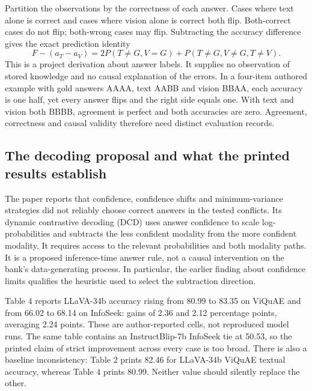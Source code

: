 Partition the observations by the correctness of each answer. Cases where
text alone is correct and cases where vision alone is correct both flip.
Both-correct cases do not flip; both-wrong cases may flip. Subtracting the
accuracy difference gives the exact prediction identity
\begin{equation}
 F-(a_T-a_V)=
 2P(T\ne G,V=G)+P(T\ne G,V\ne G,T\ne V).
 \label{exec23:conflict-identity}
\end{equation}
This is a project derivation about answer labels. It supplies no observation
of stored knowledge and no causal explanation of the errors. In a four-item
authored example with gold answers AAAA, text AABB and vision BBAA, each
accuracy is one half, yet every answer flips and the right side equals one.
With text and vision both BBBB, agreement is perfect and both accuracies are
zero. Agreement, correctness and causal validity therefore need distinct
evaluation records.~\citep{exec23_context_reference}

\subsection{The decoding proposal and what the printed results establish}
\label{exec23:conflict-decoding}

The paper reports that confidence, confidence shifts and minimum-variance
strategies did not reliably choose correct answers in the tested conflicts.
Its dynamic contrastive decoding (DCD) uses answer confidence to scale
log-probabilities and subtracts the less confident modality from the more
confident modality. It requires access to the relevant probabilities and
both modality paths. It is a proposed inference-time answer rule, not a
causal intervention on the bank's data-generating process. In particular,
the earlier finding about confidence limits qualifies the heuristic used
to select the subtraction direction.~\citep{exec23_cross_modality_conflict}

Table 4 reports LLaVA-34b accuracy rising from 80.99 to 83.35 on ViQuAE and
from 66.02 to 68.14 on InfoSeek: gains of 2.36 and 2.12 percentage points,
averaging 2.24 points. These are author-reported cells, not reproduced model
runs. The same table contains an InstructBlip-7b InfoSeek tie at 50.53, so
the printed claim of strict improvement across every case is too broad.
There is also a baseline inconsistency: Table 2 prints 82.46 for LLaVA-34b
ViQuAE textual accuracy, whereas Table 4 prints 80.99. Neither value should
silently replace the other.~\citep{exec23_cross_modality_conflict,exec23_context_reference}

